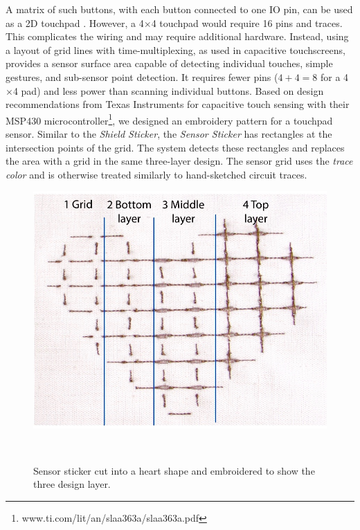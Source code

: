 \documentclass{sigchi}
\begin{document}
A matrix of such buttons, with each button connected to one IO pin, can be used as a 2D touchpad \cite{hamdan2016grabrics,5387040}. 
However, a 4$\times$4 touchpad would require 16 pins and traces. This complicates the wiring and may require additional hardware. Instead, using a layout of grid lines with time-multiplexing, as used in capacitive touchscreens, provides a sensor surface area capable of detecting individual touches, simple gestures, and sub-sensor point detection. It requires fewer pins ($4+4=8$ for a 4$\times$4 pad) and less power than scanning individual buttons. 
Based on design recommendations from Texas Instruments for capacitive touch sensing with their MSP430 microcontroller\footnote{ www.ti.com/lit/an/slaa363a/slaa363a.pdf}, we designed an embroidery pattern for a touchpad sensor. Similar to the \textit{Shield Sticker}, the \textit{Sensor Sticker} has rectangles at the intersection points of the grid. The system detects these rectangles and replaces the area with a grid in the same three-layer design. The sensor grid uses the \textit{trace color} and is otherwise treated similarly to hand-sketched circuit traces.

\begin{figure}
\centering
  \includegraphics[width=0.7\columnwidth]{figures/heart}
  \caption{Sensor sticker cut into a heart shape and embroidered to show the three design layer.}~\label{fig:Sensor}
  \vspace{-2.5em}
  \end{figure}
  
\end{document}
